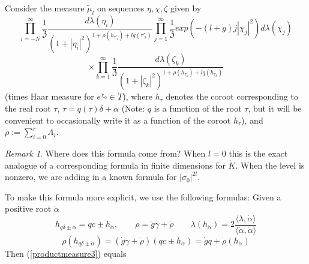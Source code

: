 \documentclass{amsart}
\theoremstyle{conjecture}
\theoremstyle{definition}
\theoremstyle{question}
\theoremstyle{questions}
\theoremstyle{remark}
\newtheorem*{remark}{Remark}
\theoremstyle{remarks}
\theoremstyle{example}
\numberwithin{equation}{section}
\begin{document}
Consider the measure $\widetilde{\mu}_l$ on sequences $\eta,\chi,\zeta$ given by
\begin{equation}\label{productmeasure3}\prod_{i=-N}^{\infty}\frac{1}{\mathfrak Z} \frac{d\lambda(\eta_i)}{(1+|\eta_i|^2)^{1+\rho(h_{\tau'_i})+lq(\tau'_i)}}  \prod_{j=1}^{\infty} \frac{1}{\mathfrak Z} exp(- (l+\dot g)j|\chi_j|^2  )d\lambda(\chi_j) \end{equation}
 $$\times \prod_{k=1}^{\infty}\frac{1}{\mathfrak Z} \frac{d\lambda(\zeta_k)}{(1+|\zeta_k|^2)^{1+\rho(h_{\tau_k})+lq(h_{\tau_k})}} $$
(times Haar measure for $e^{\chi_0}\in \dot T$), where $h_{\tau}$ denotes the coroot corresponding to the real root $\tau$, $\tau=q(\tau)\delta+\dot {\alpha}$ (Note: $q$
is a function of the root $\tau$, but it will be convenient to occasionally write it as a function
of the coroot $h_{\tau}$), and $\rho:=\sum_{i=0}^r\Lambda_i$.

\begin{remark}Where does this formula come from? When $l=0$ this is the exact analogue of a corresponding formula in finite dimensions for $\dot K$. When the level is nonzero, we are adding in a known formula for $|\sigma_0|^{2l}$.
\end{remark}

To make this formula more explicit, we use the following formulas: Given a positive root $\dot \alpha$
\begin{equation}\label{formulas}h_{q\delta \pm\dot\alpha}=qc\pm h_{\dot \alpha}, \qquad \rho=\dot g\gamma+\dot \rho
\qquad \lambda(h_{\dot\alpha})=2\frac{\langle\lambda, \dot\alpha\rangle}{\langle\dot\alpha,\dot\alpha\rangle} \end{equation}
$$\rho(h_{q\delta\pm\dot \alpha})=(\dot g\gamma+\dot \rho)(qc\pm h_{\dot\alpha})=\dot gq+\dot \rho(h_{\dot\alpha})$$
Then (\ref{productmeasure3}) equals
\end{document}
